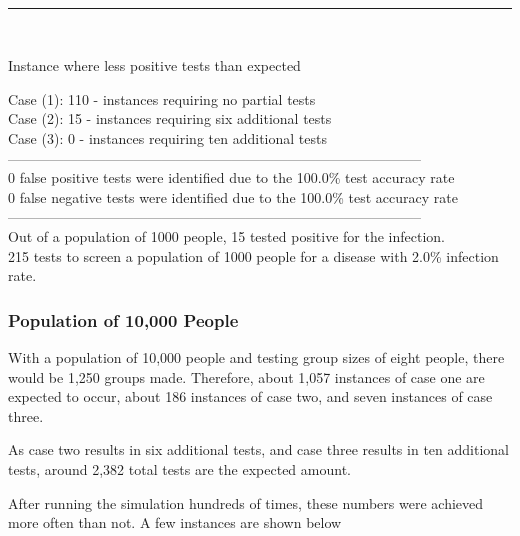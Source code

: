 \documentclass[letterpaper, 10pt,DIV=13]{scrartcl}
\numberwithin{equation}{section} %
\numberwithin{figure}{section} %
\numberwithin{table}{section} %
\begin{document}
\\
\begin{center}
\rule{12cm}{.4pt}
\end{center}
\\
\begin{displayquote}
\begin{center}
    Instance where less positive tests than expected
\end{center}
Case (1): 110 - instances requiring no partial tests\\
Case (2): 15 - instances requiring six additional tests\\
Case (3): 0 - instances requiring ten additional tests\\
-----------------------------------------------------------------------------------------\\
0 false positive tests were identified due to the 100.0\% test accuracy rate\\
0 false negative tests were identified due to the 100.0\% test accuracy rate\\
-----------------------------------------------------------------------------------------\\
Out of a population of 1000 people, 15 tested positive for the infection.\\
215 tests to screen a population of 1000 people for a disease with 2.0\% infection rate.\\
\end{displayquote}


\subsubsection{Population of 10,000 People}

With a population of 10,000 people and testing group sizes of eight people, there would be 1,250 groups made.  Therefore, about 1,057 instances of case one are expected to occur, about 186 instances of case two, and seven instances of case three.  

As case two results in six additional tests, and case three results in ten additional tests, around 2,382 total tests are the expected amount.

After running the simulation hundreds of times, these numbers were achieved more often than not.  A few instances are shown below
\end{document}
